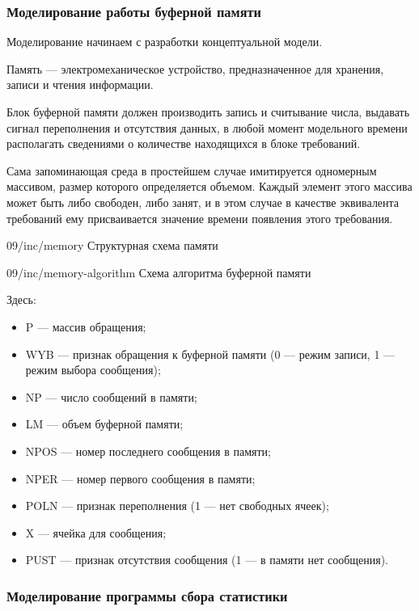 \subsubsection{Моделирование работы буферной памяти}

Моделирование начинаем с разработки концептуальной модели.

\begin{dd}
    Память --- электромеханическое устройство, предназначенное для хранения, записи и чтения информации.
\end{dd}

Блок буферной памяти должен производить запись и считывание числа, выдавать сигнал переполнения и отсутствия данных, в любой момент модельного времени располагать сведениями о количестве находящихся в блоке требований.

Сама запоминающая среда в простейшем случае имитируется одномерным массивом, размер которого определяется объемом. Каждый элемент этого массива может быть либо свободен, либо занят, и в этом случае в качестве эквивалента требований ему присваивается значение времени появления этого требования.

\image
{\textwidth}
{09/inc/memory}
{Структурная схема памяти}

\image
{\textwidth}
{09/inc/memory-algorithm}
{Схема алгоритма буферной памяти}

Здесь:

\begin{itemize}
    \item P --- массив обращения;
    \item WYB --- признак обращения к буферной памяти (0 --- режим записи, 1 --- режим
          выбора сообщения);
    \item NP --- число сообщений в памяти;
    \item LM --- объем буферной памяти;
    \item NPOS --- номер последнего сообщения в памяти;
    \item NPER --- номер первого сообщения в памяти;
    \item POLN --- признак переполнения (1 --- нет свободных ячеек);
    \item X --- ячейка для сообщения;
    \item PUST --- признак отсутствия сообщения (1 --- в памяти нет сообщения).
\end{itemize}

\subsubsection{Моделирование программы сбора статистики}

